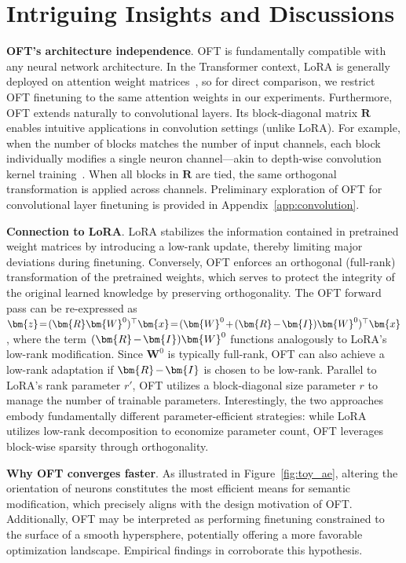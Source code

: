 \section{Intriguing Insights and Discussions}

\textbf{OFT’s architecture independence}. OFT is fundamentally compatible with any neural network architecture. In the Transformer context, LoRA is generally deployed on attention weight matrices~\cite{hulora2022}, so for direct comparison, we restrict OFT finetuning to the same attention weights in our experiments. Furthermore, OFT extends naturally to convolutional layers. Its block-diagonal matrix $\bm{R}$ enables intuitive applications in convolution settings (unlike LoRA). For example, when the number of blocks matches the number of input channels, each block individually modifies a single neuron channel—akin to depth-wise convolution kernel training~\cite{chollet2017xception}. When all blocks in $\bm{R}$ are tied, the same orthogonal transformation is applied across channels. Preliminary exploration of OFT for convolutional layer finetuning is provided in Appendix~\ref{app:convolution}.

\textbf{Connection to LoRA}. LoRA stabilizes the information contained in pretrained weight matrices by introducing a low-rank update, thereby limiting major deviations during finetuning. Conversely, OFT enforces an orthogonal (full-rank) transformation of the pretrained weights, which serves to protect the integrity of the original learned knowledge by preserving orthogonality. The OFT forward pass can be re-expressed as $\thickmuskip=2mu \medmuskip=2mu \bm{z} = (\bm{R}\bm{W}^0)^\top \bm{x} = (\bm{W}^0 + (\bm{R} - \bm{I})\bm{W}^0)^\top \bm{x}$, where the term $\thickmuskip=2mu \medmuskip=2mu (\bm{R} - \bm{I})\bm{W}^0$ functions analogously to LoRA's low-rank modification. Since $\bm{W}^0$ is typically full-rank, OFT can also achieve a low-rank adaptation if $\thickmuskip=2mu \medmuskip=2mu \bm{R} - \bm{I}$ is chosen to be low-rank. Parallel to LoRA’s rank parameter $r'$, OFT utilizes a block-diagonal size parameter $r$ to manage the number of trainable parameters. Interestingly, the two approaches embody fundamentally different parameter-efficient strategies: while LoRA utilizes low-rank decomposition to economize parameter count, OFT leverages block-wise sparsity through orthogonality.

\textbf{Why OFT converges faster}. As illustrated in Figure~\ref{fig:toy_ae}, altering the orientation of neurons constitutes the most efficient means for semantic modification, which precisely aligns with the design motivation of OFT. Additionally, OFT may be interpreted as performing finetuning constrained to the surface of a smooth hypersphere, potentially offering a more favorable optimization landscape. Empirical findings in \cite{liu2021orthogonal} corroborate this hypothesis.

